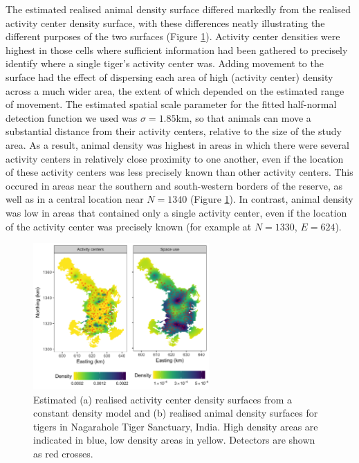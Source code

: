 \documentclass[10pt,a4paper]{article}
\begin{document}
The estimated realised animal density surface differed markedly from the realised activity center density surface, with these differences neatly illustrating the different purposes of the two surfaces (Figure \ref{tigerspaceuse}). Activity center densities were highest in those cells where sufficient information had been gathered to precisely identify where a single tiger's activity center was. Adding movement to the surface had the effect of dispersing each area of high (activity center) density across a much wider area, the extent of which depended on the estimated range of movement. The estimated spatial scale parameter for the fitted half-normal detection function we used was $\sigma=1.85$km, so that animals can move a substantial distance from their activity centers, relative to the size of the study area. As a result, animal density was highest in areas in which there were several activity centers in relatively close proximity to one another, even if the location of these activity centers was less precisely known than other activity centers. This occured in areas near the southern and south-western borders of the reserve, as well as in a central location near $N=1340$ (Figure \ref{tigerspaceuse}). In contrast, animal density was low in areas that contained only a single activity center, even if the location of the activity center was precisely known (for example at $N=1330$, $E=624$).

\begin{figure}[htbp]
\centering
\includegraphics[width=0.6\textwidth]{tiger_spaceuse.png}
\caption{Estimated (a) realised activity center density surfaces from a constant density model and (b) realised animal density surfaces for tigers in Nagarahole Tiger Sanctuary, India. High density areas are indicated in blue, low density areas in yellow. Detectors are shown as red crosses.}
\label{tigerspaceuse}
\end{figure}
\end{document}
